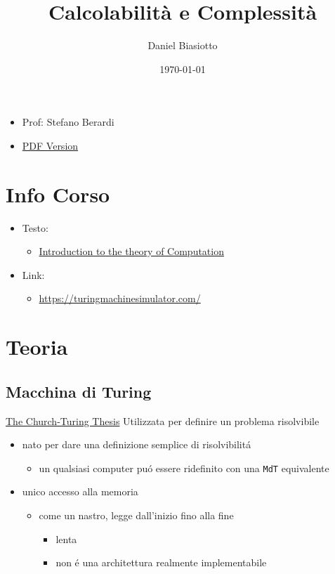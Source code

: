 \documentclass[
                        12pt, %
                        a4paper, %
                        oneside, %
                        headinclude,footinclude, %
                        BCOR5mm, %
                  ]{scrartcl}
\author{Daniel Biasiotto}
\date{\today}
\title{Calcolabilità e Complessità}
\begin{document}
\maketitle
\tableofcontents

\begin{itemize}
\item Prof: Stefano Berardi
\item \href{./20210921121153-calcolabilita\_e\_complessita.pdf}{PDF Version}
\end{itemize}
\section{Info Corso}
\label{sec:org066aa93}
\begin{itemize}
\item Testo:
\begin{itemize}
\item \href{20210921121359-introduction_to_the_theory_of_computation.org}{Introduction to the theory of Computation}
\end{itemize}
\item Link:
\begin{itemize}
\item \url{https://turingmachinesimulator.com/}
\end{itemize}
\end{itemize}
\section{Teoria}
\label{sec:org3048276}
\subsection{Macchina di Turing}
\label{sec:org1ff592f}
\uline{The Church-Turing Thesis}
Utilizzata per definire un problema risolvibile
\begin{itemize}
\item nato per dare una definizione semplice di risolvibilitá
\begin{itemize}
\item un qualsiasi computer puó essere ridefinito con una \texttt{MdT} equivalente
\end{itemize}
\item unico accesso alla memoria
\begin{itemize}
\item come un nastro, legge dall'inizio fino alla fine
\begin{itemize}
\item lenta
\item non é una architettura realmente implementabile
\end{itemize}
\end{itemize}
\end{itemize}
\end{document}
